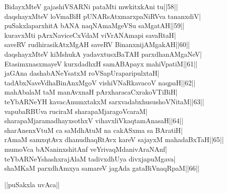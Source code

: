 \documentclass{article}
\begin{document}
BidayxMteV gajashiVSARNi pataMti mwkitxkAni tu||58||\\
daqshayxMteV loVmaBiH pUNARsAtxmarxpaNiRVva tananxdiV|\\
puSakxlaparxhitA bANA naqNAmaMgeVSu saMgatAH||59||\\
kuravxMti pArxNaviceCxVdaM viVrANAmapi savaRtaH|\\
saveRV rudhirasikAtxMgAH saveRV BinanxnijAMgakAH||60||\\
daqshayxMteV kiMshukA yadavxtusxBaTAH parxdhanAMgaNeV|\\
EtasimxnasxmayeV kurxdadhxH samABApayx mahiVpatiM||61||\\
jaGAna dashabANeYsatxM roVSapUraparipulxtaH|\\
tadAbxNaveVdhaBinAnxMgoV vishiVNaRkavacoV naqpaH||62||\\
mahAbalaM taM manAvxnaH pArxharacaCxrakoVTiBiH|\\
teYbARNeYH kavacAnumxtakxM sarxvadabxhusushoVNitaM||63||\\
vapubaRBUva ruciraM sharapaMjaragoVcaraM|\\
sharapaMjaramadhayxsothxV vihavxliVkaqtamAnasaH||64||\\
sharAnenxVtuM ca saMdhAtuM na cakASxma sa BAratiH|\\
rAmaM samxqtAvx dhanudhaqRtAvx kareV sajayxM mahadaBxTaH||65||\\
mumoVca bANaninxshitAnf veYrivaqMdanivAraNAnf|\\
teYbARNeYshashxrajAlaM tadivxdhUya divxjapuMgava|\\
shaMKaM parxdhAmxya samareV jagAda gataBiVnaqRpaM||66||\\

\begin{center}
||puSakxla uvAca||
\end{center}
\end{document}
